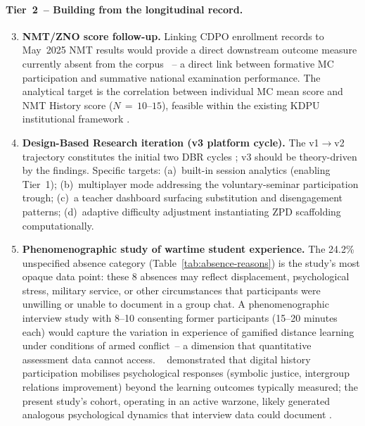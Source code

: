 \paragraph{Tier~2~-- Building from the longitudinal record.}

\begin{enumerate}
\setcounter{enumi}{2}

\item \textbf{NMT/ZNO score follow-up.}
Linking CDPO enrollment records to May~2025 NMT results would provide a direct downstream outcome measure currently absent from the corpus \cite{Korniienko2025cte}~-- a direct link between formative MC participation and summative national examination performance. The analytical target is the correlation between individual MC mean score and NMT History score ($N\,{=}\,10$--$15$), feasible within the existing KDPU institutional framework \cite{Page2021}.

\item \textbf{Design-Based Research iteration (v3 platform cycle).}
The v1$\to$v2 trajectory constitutes the initial two DBR cycles \cite{Reeves2003}; v3 should be theory-driven by the findings. Specific targets: (a)~built-in session analytics (enabling Tier~1); (b)~multiplayer mode addressing the voluntary-seminar participation trough; (c)~a teacher dashboard surfacing substitution and disengagement patterns; (d)~adaptive difficulty adjustment instantiating ZPD scaffolding~\cite{Vygotsky1978} computationally.

\item \textbf{Phenomenographic study of wartime student experience.}
The 24.2\% unspecified absence category (Table~\ref{tab:absence-reasons}) is
the study's most opaque data point: these 8 absences may reflect displacement,
psychological stress, military service, or other circumstances that participants
were unwilling or unable to document in a group chat.
A phenomenographic interview study \cite{DichevDicheva2017, Hamari2014} with
8--10 consenting former participants (15--20 minutes each) would capture the
variation in experience of gamified distance learning under conditions of armed
conflict~-- a dimension that quantitative assessment data cannot access.
\citeauthor{Ditlmann2025}~\cite{Ditlmann2025} demonstrated that digital history participation mobilises
psychological responses (symbolic justice, intergroup relations improvement)
beyond the learning outcomes typically measured; the present study's cohort,
operating in an active warzone, likely generated analogous psychological dynamics
that interview data could document \cite{Zamkova2023299, Martynets202428}.

\end{enumerate}

